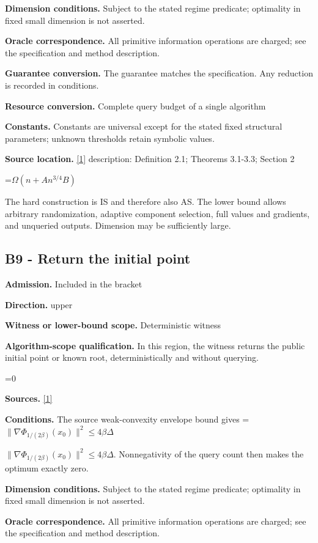 \documentclass[10pt,a4paper]{article}
\newcommand{\AtlasMath}[1]{\par\begingroup\centering\setbox0=\hbox{$\displaystyle #1$}\ifdim\wd0>1.4\linewidth\typeout{ATLAS WIDE FORMULA: \the\wd0}\fi\ifdim\wd0>\linewidth\resizebox{\linewidth}{!}{\box0}\else\box0\fi\par\endgroup}
\newcommand{\AtlasInlineMath}[1]{\begingroup\setbox0=\hbox{$#1$}\ifdim\wd0>.4\linewidth\endgroup\AtlasMath{#1}\else\endgroup$#1$\fi}
\begin{document}
\textbf{Dimension conditions.} Subject to the stated regime predicate; optimality in fixed small dimension is not asserted.

\textbf{Oracle correspondence.} All primitive information operations are charged; see the specification and method description.

\textbf{Guarantee conversion.} The guarantee matches the specification. Any reduction is recorded in conditions.

\textbf{Resource conversion.} Complete query budget of a single algorithm

\textbf{Constants.} Constants are universal except for the stated fixed structural parameters; unknown thresholds retain symbolic values.

\textbf{Source location.} \href{https://arxiv.org/pdf/2610.16991v2}{[1]} description: Definition 2.1; Theorems 3.1-3.3; Section 2

\AtlasMath{\Omega(n+An^{3/4}B)}
The hard construction is IS and therefore also AS. The lower bound allows arbitrary randomization, adaptive component selection, full values and gradients, and unqueried outputs. Dimension may be sufficiently large.

\subsection{B9 - Return the initial point}
\textbf{Admission.} Included in the bracket

\textbf{Direction.} upper

\textbf{Witness or lower-bound scope.} Deterministic witness

\textbf{Algorithm-scope qualification.} In this region, the witness returns the public initial point or known root, deterministically and without querying.

\AtlasMath{0}
\textbf{Sources.} \href{https://arxiv.org/pdf/2610.16991v2}{[1]}

\textbf{Conditions.} The source weak-convexity envelope bound gives \AtlasInlineMath{\|\nabla\Phi_{1/(2\beta)}(x_0)\|^2\le4\beta\Delta}. Nonnegativity of the query count then makes the optimum exactly zero.

\textbf{Dimension conditions.} Subject to the stated regime predicate; optimality in fixed small dimension is not asserted.

\textbf{Oracle correspondence.} All primitive information operations are charged; see the specification and method description.
\end{document}
